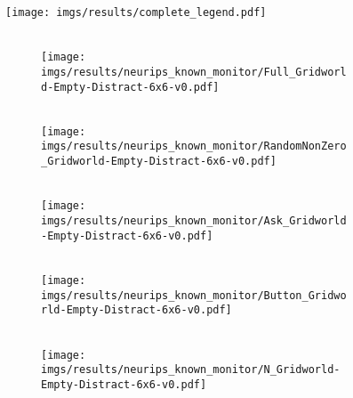 %
%
%
\begin{figure}[tbh]
    \centering
    \texttt{[image: imgs/results/complete\_legend.pdf]}
    \\[3pt]
    \hfill
    \begin{subfigure}[b]{0.158\linewidth}
        \centering
        \\
        \texttt{[image: imgs/results/neurips\_known\_monitor/Full\_Gridworld-Empty-Distract-6x6-v0.pdf]}
    \end{subfigure} 
    \hfill
        \begin{subfigure}[b]{0.158\linewidth}
        \centering
        \\
        \texttt{[image: imgs/results/neurips\_known\_monitor/RandomNonZero\_Gridworld-Empty-Distract-6x6-v0.pdf]}
    \end{subfigure} 
    \hfill
    \begin{subfigure}[b]{0.158\textwidth}
        \centering
        \\
        \texttt{[image: imgs/results/neurips\_known\_monitor/Ask\_Gridworld-Empty-Distract-6x6-v0.pdf]}
    \end{subfigure} 
    \hfill
        \begin{subfigure}[b]{0.158\textwidth}
        \centering
        \\
        \texttt{[image: imgs/results/neurips\_known\_monitor/Button\_Gridworld-Empty-Distract-6x6-v0.pdf]}
    \end{subfigure} 
    \hfill
    \begin{subfigure}[b]{0.158\textwidth}
        \centering
        \\
        \texttt{[image: imgs/results/neurips\_known\_monitor/N\_Gridworld-Empty-Distract-6x6-v0.pdf]}
    \end{subfigure} 
    \hfill
    \begin{subfigure}[b]{0.158\textwidth}
        \centering

\end{subfigure}
\end{figure}
